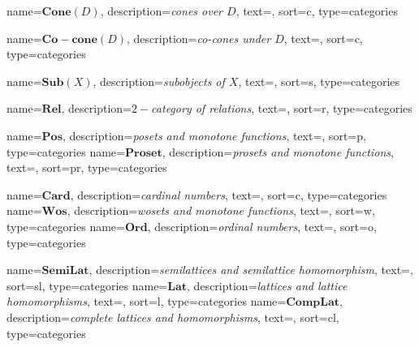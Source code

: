   {name=$\mathbf{Cone}(D)$, description=\emph{cones over $D$},
  text={}, sort=c, type=categories}
  \DeclareMathOperator{\Cone}{\gls{Cone}}%

  {name=$\mathbf{Co-cone}(D)$, description=\emph{co-cones under $D$},
  text={}, sort=c, type=categories}
  \DeclareMathOperator{\Cocone}{\gls{Co-cone}}%

  {name=$\mathbf{Sub}(X)$, description=\emph{subobjects of $X$},
  text={}, sort=s, type=categories}
  \DeclareMathOperator{\Sub}{Sub}%


  {name=$\mathbf{Rel}$, description=\emph{$2-$category of relations},
  text={}, sort=r, type=categories}
  \DeclareMathOperator{\Rel}{\gls{Rel}}%

  {name=$\mathbf{Pos}$, description=\emph{posets and monotone functions},
  text={}, sort=p, type=categories}
  \DeclareMathOperator{\Pos}{\gls{Pos}}%
  {name=$\mathbf{Proset}$, description=\emph{prosets and monotone functions},
  text={}, sort=pr, type=categories}
  \DeclareMathOperator{\Proset}{\gls{Proset}}%

  {name=$\mathbf{Card}$, description=\emph{cardinal numbers},
  text={}, sort=c, type=categories}
  \DeclareMathOperator{\Card}{\gls{Card}}%
  {name=$\mathbf{Wos}$, description=\emph{wosets and monotone functions},
  text={}, sort=w, type=categories}
  \DeclareMathOperator{\Wos}{\gls{Wos}}%
  {name=$\mathbf{Ord}$, description=\emph{ordinal numbers},
  text={}, sort=o, type=categories}
  \DeclareMathOperator{\Ord}{\gls{Ord}}%

  {name=$\mathbf{SemiLat}$, description=\emph{semilattices and semilattice homomorphism},
  text={}, sort=sl, type=categories}
  \DeclareMathOperator{\SemiLat}{\gls{SemiLat}}%
  {name=$\mathbf{Lat}$, description=\emph{lattices and lattice homomorphisms},
  text={}, sort=l, type=categories}
  \DeclareMathOperator{\Lat}{\gls{Lat}}%
  {name=$\mathbf{CompLat}$, description=\emph{complete lattices and homomorphisms},
  text={}, sort=cl, type=categories}
  \DeclareMathOperator{\CompLat}{\gls{CompLat}}%
